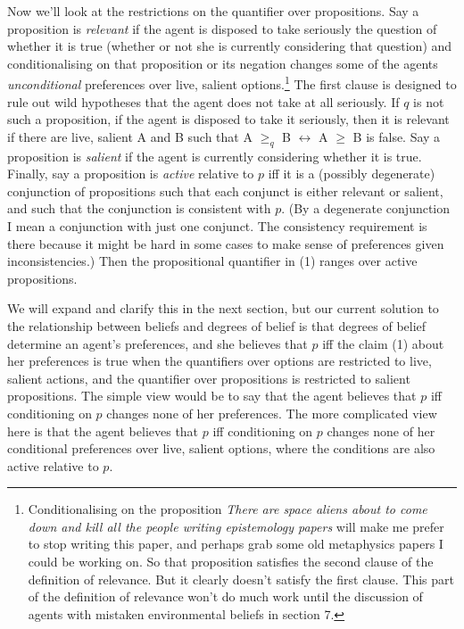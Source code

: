 Now we'll look at the restrictions on the quantifier over propositions. Say a proposition is \textit{relevant} if the agent is disposed to take seriously the question of whether it is true (whether or not she is currently considering that question) and conditionalising on that proposition or its negation changes some of the agents \textit{unconditional} preferences over live, salient options.\footnote{Conditionalising on the proposition \textit{There are space aliens about to come down and kill all the people writing epistemology papers} will make me prefer to stop writing this paper, and perhaps grab some old metaphysics papers I could be working on. So that proposition satisfies the second clause of the definition of relevance. But it clearly doesn't satisfy the first clause. This part of the definition of relevance won't do much work until the discussion of agents with mistaken environmental beliefs in section 7.} The first clause is designed to rule out wild hypotheses that the agent does not take at all seriously. If \(q\) is not such a proposition, if the agent is disposed to take it seriously, then it is relevant if there are live, salient A and B such that A \(\geq _q\) B \(\leftrightarrow\) A \(\geq\) B is false. Say a proposition is \textit{salient} if the agent is currently considering whether it is true. Finally, say a proposition is \textit{active} relative to \(p\) iff it is a (possibly degenerate) conjunction of propositions such that each conjunct is either relevant or salient, and such that the conjunction is consistent with \(p\). (By a degenerate conjunction I mean a conjunction with just one conjunct. The consistency requirement is there because it might be hard in some cases to make sense of preferences given inconsistencies.) Then the propositional quantifier in (1) ranges over active propositions.

We will expand and clarify this in the next section, but our current solution to the relationship between beliefs and degrees of belief is that degrees of belief determine an agent's preferences, and she believes that \(p\) iff the claim (1) about her preferences is true when the quantifiers over options are restricted to live, salient actions, and the quantifier over propositions is restricted to salient propositions. The simple view would be to say that the agent believes that \(p\) iff conditioning on \(p\) changes none of her preferences. The more complicated view here is that the agent believes that \(p\) iff conditioning on \(p\) changes none of her conditional preferences over live, salient options, where the conditions are also active relative to \(p\).

